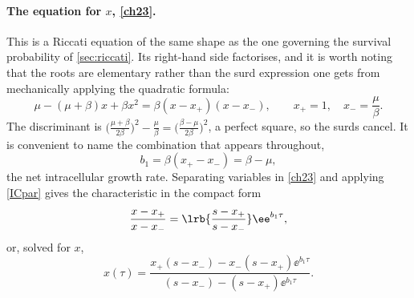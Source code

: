 \paragraph{The equation for $x$, \eqref{ch23}.}
This is a Riccati equation of the same shape as the one governing the survival
probability of \cref{sec:riccati}. Its right-hand side factorises, and it is worth noting
that the roots are elementary rather than the surd expression one gets from mechanically
applying the quadratic formula:
\begin{equation}
\label{eq:xpm}
\mu - (\mu+\beta)x + \beta x^2 = \beta(x-x_+)(x-x_-),
\qquad
x_+ = 1,\quad x_- = \frac{\mu}{\beta}.
\end{equation}
The discriminant is $\bigl(\tfrac{\mu+\beta}{2\beta}\bigr)^2 - \tfrac{\mu}{\beta}
= \bigl(\tfrac{\beta-\mu}{2\beta}\bigr)^2$, a perfect square, so the surds cancel. It is
convenient to name the combination that appears throughout,
\begin{equation}
\label{eq:b1}
b_1 = \beta(x_+ - x_-) = \beta-\mu ,
\end{equation}
the net intracellular growth rate. Separating variables in \cref{ch23} and applying
\cref{ICpar} gives the characteristic in the compact form
\begin{equation}
\label{eq:xratio}
\frac{x-x_+}{x-x_-} = \lrb{\frac{s-x_+}{s-x_-}}\ee^{b_1\tau},
\end{equation}
or, solved for $x$,
\begin{equation}
\label{xabd}
x(\tau) = \frac{x_+(s-x_-) - x_-(s-x_+)\ee^{b_1\tau}}{(s-x_-) - (s-x_+)\ee^{b_1\tau}} .
\end{equation}

